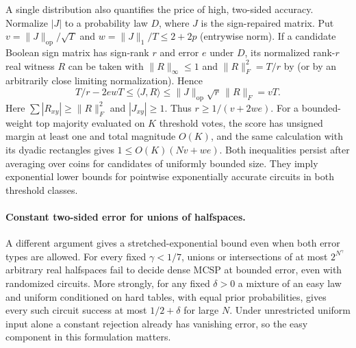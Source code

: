 \documentclass[11pt]{article}
\begin{document}
A single distribution also quantifies the price of high, two-sided accuracy. Normalize $|J|$ to a probability law $D$, where $J$ is the sign-repaired matrix. Put $v=\|J\|_{\mathrm{op}}/\sqrt T$ and $w=\|J\|_1/T\le 2+2p$ (entrywise norm). If a candidate Boolean sign matrix has sign-rank $r$ and error $e$ under $D$, its normalized rank-$r$ real witness $R$ can be taken with $\|R\|_\infty\le1$ and $\|R\|_F^2=T/r$ by \cite[Theorem 2.4]{rs} (or by an arbitrarily close limiting normalization). Hence
\[
 T/r-2ewT\le \langle J,R\rangle\le\|J\|_{\mathrm{op}}\sqrt r\,\|R\|_F=vT .
\]
Here $\sum |R_{xy}|\ge \|R\|_F^2$ and $|J_{xy}|\ge1$. Thus $r\ge 1/(v+2we)$. For a bounded-weight top majority evaluated on $K$ threshold votes, the score has unsigned margin at least one and total magnitude $O(K)$, and the same calculation with its dyadic rectangles gives $1\le O(K)(Nv+we)$. Both inequalities persist after averaging over coins for candidates of uniformly bounded size. They imply exponential lower bounds for pointwise exponentially accurate circuits in both threshold classes.

\paragraph{Constant two-sided error for unions of halfspaces.}
A different argument gives a stretched-exponential bound even when both error types are allowed. For every fixed $\gamma<1/7$, unions or intersections of at most $2^{N^\gamma}$ arbitrary real halfspaces fail to decide dense MCSP at bounded error, even with randomized circuits. More strongly, for any fixed $\delta>0$ a mixture of an easy law and uniform conditioned on hard tables, with equal prior probabilities, gives every such circuit success at most $1/2+\delta$ for large $N$. Under unrestricted uniform input alone a constant rejection already has vanishing error, so the easy component in this formulation matters.
\end{document}
